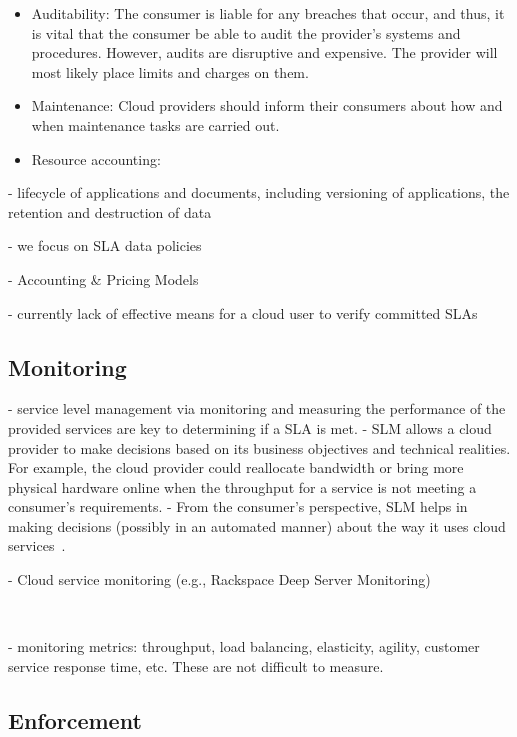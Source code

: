 \begin{itemize}
 \item Auditability: The consumer is liable for any breaches that occur, and thus, it is  vital that the consumer be able to audit the provider's systems and procedures. However, audits are disruptive and expensive. The provider will most likely place limits and charges on them.
 
 \item Maintenance: Cloud providers should inform their consumers about how and when maintenance tasks are carried out.

 \item Resource accounting:
\end{itemize}

- lifecycle of applications and documents, including versioning of applications, the retention and destruction of data 


- we focus on SLA data policies~\cite{Mee12}



- Accounting \& Pricing Models~\cite{MMS13}


- currently lack of effective means for a cloud user to verify committed SLAs


\subsection{Monitoring} \label{sect:sla-monitoring}

- service level management via monitoring and measuring the performance of the provided services are key to determining if a SLA is met.
- SLM allows a cloud provider to make decisions based on its business objectives and technical realities. For example, the cloud provider could reallocate bandwidth or bring more physical hardware online when the throughput for a service is not meeting a consumer's requirements.
- From the consumer's perspective, SLM helps in making decisions (possibly in an automated manner) about the way it uses cloud services~\cite{Ahr+10}.


- Cloud service monitoring (e.g., Rackspace Deep Server Monitoring)

~\cite{ABD+13,FEH+14}

- monitoring metrics: throughput, load balancing, elasticity, agility, customer service response time, etc. These are not difficult to measure.


\subsection{Enforcement} \label{sect:sla-enforcement}

